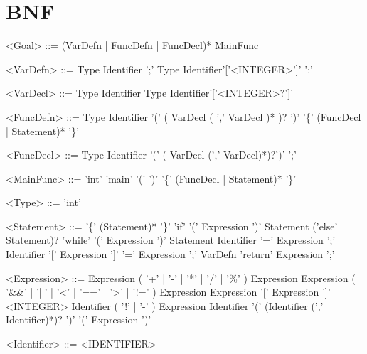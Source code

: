\documentclass{ctexart}
\newenvironment{typewriterfont}{\ttfamily}{\par}
\begin{document}
\section{BNF}
\setlength{\grammarindent}{8em} %
\begin{typewriterfont}
\begin{grammar}
<Goal> ::= (VarDefn | FuncDefn | FuncDecl)* MainFunc

<VarDefn> ::= Type Identifier ';'
\alt Type Identifier'['<INTEGER>']' ';'

<VarDecl> ::= Type Identifier
\alt Type Identifier'['<INTEGER>?']'

<FuncDefn>  ::= Type Identifier '(' ( VarDecl ( ',' VarDecl )* )? ')' '\{' (FuncDecl | Statement)* '\}'

<FuncDecl> ::= Type Identifier '(' ( VarDecl (',' VarDecl)*)?')' ';'

<MainFunc> ::= 'int' 'main' '(' ')' '\{' (FuncDecl | Statement)* '\}'

<Type> ::= 'int'

<Statement> ::= '\{' (Statement)* '\}'
\alt 'if' '(' Expression ')' Statement ('else' Statement)?
\alt 'while' '(' Expression ')' Statement
\alt Identifier '=' Expression ';'
\alt Identifier '[' Expression ']' '=' Expression ';'
\alt VarDefn
\alt 'return' Expression ';'

<Expression>	::=	Expression ( '+' | '-' | '*' | '/' | '\%' ) Expression
\alt Expression ( '\&\&' | '||' | '\textless' | '==' | '\textgreater' | '!=' ) Expression
\alt Expression '[' Expression ']'
\alt <INTEGER>
\alt Identifier
\alt ( '!' | '-' ) Expression
\alt Identifier '(' (Identifier (',' Identifier)*)? ')'
\alt '(' Expression ')'

<Identifier>	::=	<IDENTIFIER>

\end{grammar}
\end{typewriterfont}

\newpage
\end{document}
